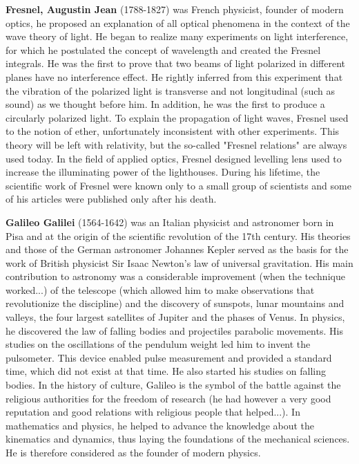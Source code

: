 \textbf{Fresnel, Augustin Jean} (1788-1827) was French physicist, founder of modern optics, he proposed an explanation of all optical phenomena in the context of the wave theory of light. He began to realize many experiments on light interference, for which he postulated the concept of wavelength and created the Fresnel integrals. He was the first to prove that two beams of light polarized in different planes have no interference effect. He rightly inferred from this experiment that the vibration of the polarized light is transverse and not longitudinal (such as sound) as we thought before him. In addition, he was the first to produce a circularly polarized light. To explain the propagation of light waves, Fresnel used to the notion of ether, unfortunately inconsistent with other experiments. This theory will be left with relativity, but the so-called "Fresnel relations" are always used today. In the field of applied optics, Fresnel designed levelling lens used to increase the illuminating power of the lighthouses. During his lifetime, the scientific work of Fresnel were known only to a small group of scientists and some of his articles were published only after his death.

{}

\textbf{Galileo Galilei} (1564-1642) was an Italian physicist and astronomer born in Pisa and at the origin of the scientific revolution of the 17th century. His theories and those of the German astronomer Johannes Kepler served as the basis for the work of British physicist Sir Isaac Newton's law of universal gravitation. His main contribution to astronomy was a considerable improvement (when the technique worked...) of the telescope (which allowed him to make observations that revolutionize the discipline) and the discovery of sunspots, lunar mountains and valleys, the four largest satellites of Jupiter and the phases of Venus. In physics, he discovered the law of falling bodies and projectiles parabolic movements. His studies on the oscillations of the pendulum weight led him to invent the pulsometer. This device enabled pulse measurement and provided a standard time, which did not exist at that time. He also started his studies on falling bodies. In the history of culture, Galileo is the symbol of the battle against the religious authorities for the freedom of research (he had however a very good reputation and good relations with religious people that helped...). In mathematics and physics, he helped to advance the knowledge about the kinematics and dynamics, thus laying the foundations of the mechanical sciences. He is therefore considered as the founder of modern physics.

